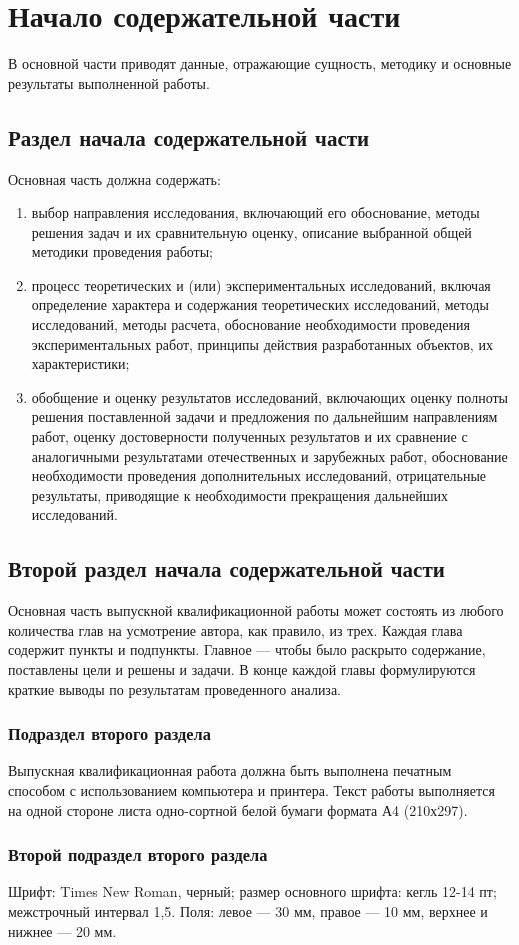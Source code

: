 \chapter{Начало содержательной части}

В основной части приводят данные, отражающие сущность, методику и основные результаты выполненной работы.

\section{Раздел начала содержательной части}

Основная часть должна содержать:
\begin{enumerate}
	\item выбор направления исследования, включающий его обоснование, методы решения задач и их сравнительную оценку, описание выбранной общей методики проведения работы;
	\item процесс теоретических и (или) экспериментальных исследований, включая определение характера и содержания теоретических исследований, методы исследований, методы расчета, обоснование необходимости проведения экспериментальных работ, принципы действия разработанных объектов, их характеристики;
	\item обобщение и оценку результатов исследований, включающих оценку полноты решения поставленной задачи и предложения по дальнейшим направлениям работ, оценку достоверности полученных результатов и их сравнение с аналогичными результатами отечественных и зарубежных работ, обоснование необходимости проведения дополнительных исследований, отрицательные результаты, приводящие к необходимости прекращения дальнейших исследований.
\end{enumerate}

\section{Второй раздел начала содержательной части}

Основная часть выпускной квалификационной работы может состоять из любого количества глав на усмотрение автора, как правило, из трех. Каждая глава содержит пункты и подпункты. Главное --- чтобы было раскрыто содержание, поставлены цели и решены и задачи. В конце каждой главы формулируются краткие выводы по результатам проведенного анализа.

\subsection{Подраздел второго раздела}

Выпускная квалификационная работа должна быть выполнена печатным способом с использованием компьютера и принтера. Текст работы выполняется на одной стороне листа одно-сортной белой бумаги формата А4 (210х297).

\subsection{Второй подраздел второго раздела}

Шрифт: Times New Roman, черный; размер основного шрифта: кегль 12-14 пт; межстрочный интервал 1,5. Поля: левое –-- 30 мм, правое –-- 10 мм, верхнее и нижнее –-- 20 мм.
